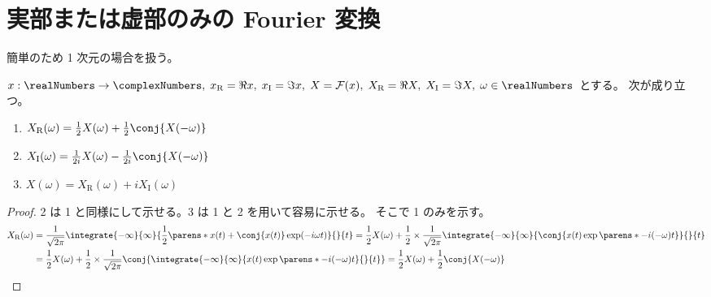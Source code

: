     \section{実部または虚部のみの Fourier 変換}
        簡単のため 1 次元の場合を扱う。
        \begin{shadebox}
            $x:\realNumbers\to\complexNumbers,\;x_\text{R} = \Re{x},\;x_\text{I} = \Im{x},\;X = \mathcal{F}(x),\;X_\text{R} = \Re{X},\;X_\text{I} = \Im{X},\;\omega\in\realNumbers$ とする。
            次が成り立つ。
            \begin{enumerate}
                \item $X_\text{R}(\omega) = \frac{1}{2}X(\omega) + \frac{1}{2}\conj{X(-\omega)}$
                \item $X_\text{I}(\omega) = \frac{1}{2i}X(\omega) - \frac{1}{2i}\conj{X(-\omega)}$
                \item $X(\omega) = X_\text{R}(\omega) + i X_\text{I}(\omega)$
            \end{enumerate}
        \end{shadebox}
        \begin{proof}
            \quad\par
            2 は 1 と同様にして示せる。3 は 1 と 2 を用いて容易に示せる。
            そこで 1 のみを示す。
            \begin{align*}
                X_\text{R}(\omega) &= \frac{1}{\sqrt{2\pi}}\integrate{-\infty}{\infty}{\frac{1}{2}\parens*{x(t)+\conj{x(t)}}\exp(-i\omega t)}{}{t} = \frac{1}{2}X(\omega) + \frac{1}{2}\times\frac{1}{\sqrt{2\pi}}\integrate{-\infty}{\infty}{\conj{x(t)\exp\parens*{-i(-\omega) t}}}{}{t} \\
                &= \frac{1}{2}X(\omega) + \frac{1}{2}\times\frac{1}{\sqrt{2\pi}}\conj{\integrate{-\infty}{\infty}{x(t)\exp\parens*{-i(-\omega) t}}{}{t}} = \frac{1}{2}X(\omega) + \frac{1}{2}\conj{X(-\omega)}
            \end{align*}
        \end{proof}
